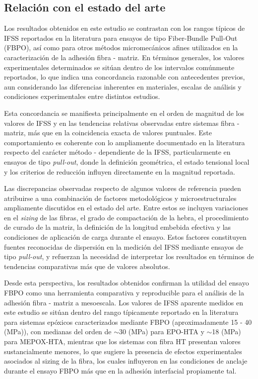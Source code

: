 \subsection{Relación con el estado del arte}

Los resultados obtenidos en este estudio se contrastan con los rangos típicos de IFSS reportados
en la literatura para ensayos de tipo Fiber-Bundle Pull-Out (FBPO), así como para otros métodos
micromecánicos afines utilizados en la caracterización de la adhesión fibra - matriz. En términos
generales, los valores experimentales determinados se sitúan dentro de los intervalos
comúnmente reportados, lo que indica una concordancia razonable con antecedentes previos, aun
considerando las diferencias inherentes en materiales, escalas de análisis y condiciones
experimentales entre distintos estudios.

Esta concordancia se manifiesta principalmente en el orden de magnitud de los valores de IFSS
y en las tendencias relativas observadas entre sistemas fibra - matriz, más que en la coincidencia
exacta de valores puntuales. Este comportamiento es coherente con lo ampliamente documentado en
la literatura respecto del carácter método - dependiente de la IFSS, particularmente en ensayos
de tipo \emph{pull-out}, donde la definición geométrica, el estado tensional local y los criterios
de reducción influyen directamente en la magnitud reportada.

Las discrepancias observadas respecto de algunos valores de referencia pueden atribuirse a una
combinación de factores metodológicos y microestructurales ampliamente discutidos en el estado
del arte. Entre estos se incluyen variaciones en el \textit{sizing} de las fibras, el grado de
compactación de la hebra, el procedimiento de curado de la matriz, la definición de la longitud
embebida efectiva y las condiciones de aplicación de carga durante el ensayo. Estos factores
constituyen fuentes reconocidas de dispersión en la medición del IFSS mediante ensayos de tipo
\emph{pull-out}, y refuerzan la necesidad de interpretar los resultados en términos de tendencias
comparativas más que de valores absolutos.

Desde esta perspectiva, los resultados obtenidos confirman la utilidad del ensayo FBPO como una
herramienta comparativa y reproducible para el análisis de la adhesión fibra - matriz a mesoescala.
Los valores de IFSS aparente medidos en este estudio se sitúan dentro del rango típicamente
reportado en la literatura para sistemas epóxicos caracterizados mediante FBPO
(aproximadamente 15 - 40 (MPa)), con medianas del orden de $\sim$30 (MPa) para EPO-HTA y
$\sim$18 (MPa) para MEPOX-HTA, mientras que los sistemas con fibra HT presentan valores
sustancialmente menores, lo que sugiere la presencia de efectos experimentales asociados
al sizing de la fibra, los cuales influyeron en las condiciones de anclaje durante el ensayo
FBPO más que en la adhesión interfacial propiamente tal.

